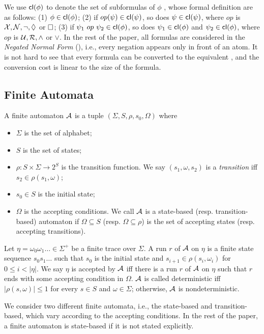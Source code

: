 We use ${\sf cl}(\phi)$ to denote the set of subformulas of $\phi$ \cite{}, whose formal definition are as follows: (1) $\phi\in{\sf cl}(\phi)$; (2) if $op (\psi)\in{\sf cl}(\psi)$, so does $\psi\in{\sf cl}(\psi)$, where $op$ is $\mathcal{X},\mathcal{N},\neg,\Diamond$ or $\Box$; (3) if $\psi_1\ op\ \psi_2\in{\sf cl}(\phi)$, so does $\psi_1\in{\sf cl}(\phi)$ and $\psi_2\in{\sf cl}(\phi)$, where $op$ is $\mathcal{U},\mathcal{R},\wedge$ or $\vee$. In the rest of the paper, all \ltlf formulas are considered in the \emph{Negated Normal Form} (\NNF), i.e., every negation appears only in front of an atom. It is not hard to see that every \ltlf formula can be converted to the equivalent \NNF, and the conversion cost is linear to the size of the formula.

\subsection{Finite Automata}
\noindent A finite automaton $\mathcal{A}$ is a tuple $(\Sigma, S, \rho, s_0, \Omega)$ where 
\begin{itemize}
	\item $\Sigma$ is the set of alphabet;
	\item $S$ is the set of states;
	\item $\rho: S\times\Sigma \rightarrow 2^S$ is the transition function. We say $(s_1,\omega, s_2)$ is a \emph{transition} iff $s_2\in\rho(s_1,\omega)$;
	\item $s_0\in S$ is the initial state;
	\item $\Omega$ is the accepting conditions. We call $\mathcal{A}$ is a state-based (resp. transition-based) automaton if $\Omega\subseteq S$ (resp. $\Omega\subseteq \rho$) is the set of accepting states (resp. accepting transitions).
\end{itemize}
Let $\eta=\omega_0\omega_1\ldots\in\Sigma^+$ be a finite trace over $\Sigma$. A run $r$ of $\mathcal{A}$ on $\eta$ is a finite state sequence $s_0 s_1\ldots$ such that $s_0$ is the initial state and $s_{i+1}\in\rho(s_i,\omega_i)$ for $0\leq i < |\eta|$. We say $\eta$ is accepted by $\mathcal{A}$ iff there is a run $r$ of $\mathcal{A}$ on $\eta$ such that $r$ ends with some accepting condition in $\Omega$. $\mathcal{A}$ is called deterministic iff $|\rho(s,\omega)| \leq 1$ for every $s\in S$ and $\omega\in\Sigma$; otherwise, $\mathcal{A}$ is nondeterministic. 

We consider two different finite automata, i.e., the state-based and transition-based, which vary according to the accepting conditions. In the rest of the paper, a finite automaton is state-based if it is not stated explicitly.  

